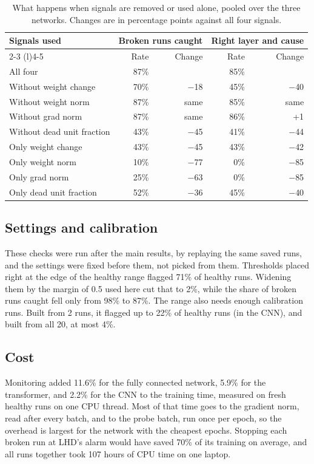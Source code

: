 \documentclass[11pt]{article}
\begin{document}
\begin{table}[t]
\centering
\small
\caption{What happens when signals are removed or used alone, pooled over the three networks. Changes are in percentage points against all four signals.}
\label{tab:ablation}
\begin{tabular}{@{}lrrrr@{}}
\toprule
Signals used & \multicolumn{2}{c}{Broken runs caught} & \multicolumn{2}{c}{Right layer and cause} \\
\cmidrule(lr){2-3} \cmidrule(l){4-5}
 & Rate & Change & Rate & Change \\
\midrule
All four & 87\% & & 85\% & \\
\midrule
Without weight change & 70\% & $-$18 & 45\% & $-$40 \\
Without weight norm & 87\% & same & 85\% & same \\
Without grad norm & 87\% & same & 86\% & +1 \\
Without dead unit fraction & 43\% & $-$45 & 41\% & $-$44 \\
\midrule
Only weight change & 43\% & $-$45 & 43\% & $-$42 \\
Only weight norm & 10\% & $-$77 & 0\% & $-$85 \\
Only grad norm & 25\% & $-$63 & 0\% & $-$85 \\
Only dead unit fraction & 52\% & $-$36 & 45\% & $-$40 \\
\bottomrule
\end{tabular}
\end{table}

\subsection{Settings and calibration}

These checks were run after the main results, by replaying the same saved runs, and the settings were fixed before them, not picked from them. Thresholds placed right at the edge of the healthy range flagged 71\% of healthy runs. Widening them by the margin of 0.5 used here cut that to 2\%, while the share of broken runs caught fell only from 98\% to 87\%. The range also needs enough calibration runs. Built from 2 runs, it flagged up to 22\% of healthy runs (in the CNN), and built from all 20, at most 4\%.

\subsection{Cost}

Monitoring added 11.6\% for the fully connected network, 5.9\% for the transformer, and 2.2\% for the CNN to the training time, measured on fresh healthy runs on one CPU thread. Most of that time goes to the gradient norm, read after every batch, and to the probe batch, run once per epoch, so the overhead is largest for the network with the cheapest epochs. Stopping each broken run at LHD's alarm would have saved 70\% of its training on average, and all runs together took 107 hours of CPU time on one laptop.
\end{document}
